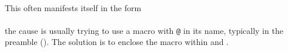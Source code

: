 \begin{plainlist}










\item[\textmess{!}] 
     \\

 This often manifests itself in the form \\
 \\
 the cause
is usually trying to use a macro with \texttt{@} in its name, typically
in the preamble (\seeatincode)\idxatincode. 
The solution is to enclose the macro within
\cmd{\makeatletter} and \cmd{\makeatother}. 


\end{plainlist}

